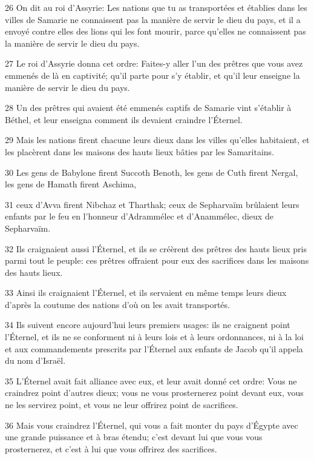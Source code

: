 \par 26 On dit au roi d'Assyrie: Les nations que tu as transportées et établies dans les villes de Samarie ne connaissent pas la manière de servir le dieu du pays, et il a envoyé contre elles des lions qui les font mourir, parce qu'elles ne connaissent pas la manière de servir le dieu du pays.
\par 27 Le roi d'Assyrie donna cet ordre: Faites-y aller l'un des prêtres que vous avez emmenés de là en captivité; qu'il parte pour s'y établir, et qu'il leur enseigne la manière de servir le dieu du pays.
\par 28 Un des prêtres qui avaient été emmenés captifs de Samarie vint s'établir à Béthel, et leur enseigna comment ils devaient craindre l'Éternel.
\par 29 Mais les nations firent chacune leurs dieux dans les villes qu'elles habitaient, et les placèrent dans les maisons des hauts lieux bâties par les Samaritains.
\par 30 Les gens de Babylone firent Succoth Benoth, les gens de Cuth firent Nergal, les gens de Hamath firent Aschima,
\par 31 ceux d'Avva firent Nibchaz et Tharthak; ceux de Sepharvaïm brûlaient leurs enfants par le feu en l'honneur d'Adrammélec et d'Anammélec, dieux de Sepharvaïm.
\par 32 Ils craignaient aussi l'Éternel, et ils se créèrent des prêtres des hauts lieux pris parmi tout le peuple: ces prêtres offraient pour eux des sacrifices dans les maisons des hauts lieux.
\par 33 Ainsi ils craignaient l'Éternel, et ils servaient en même temps leurs dieux d'après la coutume des nations d'où on les avait transportés.
\par 34 Ils suivent encore aujourd'hui leurs premiers usages: ils ne craignent point l'Éternel, et ils ne se conforment ni à leurs lois et à leurs ordonnances, ni à la loi et aux commandements prescrits par l'Éternel aux enfants de Jacob qu'il appela du nom d'Israël.
\par 35 L'Éternel avait fait alliance avec eux, et leur avait donné cet ordre: Vous ne craindrez point d'autres dieux; vous ne vous prosternerez point devant eux, vous ne les servirez point, et vous ne leur offrirez point de sacrifices.
\par 36 Mais vous craindrez l'Éternel, qui vous a fait monter du pays d'Égypte avec une grande puissance et à bras étendu; c'est devant lui que vous vous prosternerez, et c'est à lui que vous offrirez des sacrifices.

